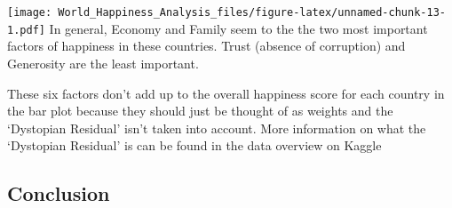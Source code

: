 \documentclass[]{article}
\newenvironment{Shaded}{\begin{snugshade}}{\end{snugshade}}
\newcommand{\DataTypeTok}[1]{\textcolor[rgb]{0.13,0.29,0.53}{#1}}
\newcommand{\DecValTok}[1]{\textcolor[rgb]{0.00,0.00,0.81}{#1}}
\newcommand{\FloatTok}[1]{\textcolor[rgb]{0.00,0.00,0.81}{#1}}
\newcommand{\KeywordTok}[1]{\textcolor[rgb]{0.13,0.29,0.53}{\textbf{#1}}}
\newcommand{\NormalTok}[1]{#1}
\newcommand{\OperatorTok}[1]{\textcolor[rgb]{0.81,0.36,0.00}{\textbf{#1}}}
\newcommand{\OtherTok}[1]{\textcolor[rgb]{0.56,0.35,0.01}{#1}}
\newcommand{\StringTok}[1]{\textcolor[rgb]{0.31,0.60,0.02}{#1}}
\begin{document}
\begin{Shaded}
\end{Shaded}

\texttt{[image: World\_Happiness\_Analysis\_files/figure-latex/unnamed-chunk-13-1.pdf]}
In general, Economy and Family seem to the the two most important
factors of happiness in these countries. Trust (absence of corruption)
and Generosity are the least important.

These six factors don't add up to the overall happiness score for each
country in the bar plot because they should just be thought of as
weights and the `Dystopian Residual' isn't taken into account. More
information on what the `Dystopian Residual' is can be found in the data
overview on Kaggle

\hypertarget{conclusion}{%
\subsection{Conclusion}\label{conclusion}}
\end{document}
